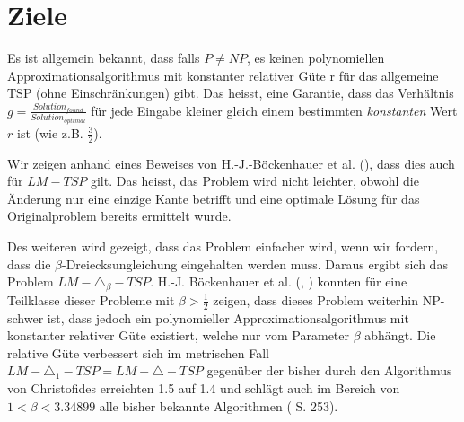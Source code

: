 \documentclass[a4paper,11pt]{scrreprt}
\begin{document}
\begin{description}
%
%
%

\end{description}

\section{Ziele}

Es ist allgemein bekannt, dass falls $P \not= NP$, es keinen polynomiellen Approximationsalgorithmus mit konstanter relativer Güte r für das allgemeine TSP (ohne Einschränkungen) gibt. Das heisst, eine Garantie, dass das Verhältnis $g = \frac{Solution_{found}}{Solution_{optimal}}$ für jede Eingabe kleiner gleich einem bestimmten \emph{konstanten} Wert $r$ ist (wie z.B. $\frac{3}{2}$).

Wir zeigen anhand eines Beweises von H.-J.-Böckenhauer et al. (\cite{bok1}), dass dies auch für $LM-TSP$ gilt. Das heisst, das Problem wird nicht leichter, obwohl die Änderung nur eine einzige Kante betrifft und eine optimale Lösung für das Originalproblem bereits ermittelt wurde.

Des weiteren wird gezeigt, dass das Problem einfacher wird, wenn wir fordern, dass die $\beta$-Dreiecksungleichung eingehalten werden muss. Daraus ergibt sich das Problem $LM-\triangle_\beta-TSP$. H.-J. Böckenhauer et al. (\cite{bok1}, \cite{bok2}) konnten für eine Teilklasse dieser Probleme mit $\beta > \frac{1}{2}$ zeigen, dass dieses Problem weiterhin NP-schwer ist, dass jedoch ein polynomieller Approximationsalgorithmus mit konstanter relativer Güte existiert, welche nur vom Parameter $\beta$ abhängt. Die relative Güte verbessert sich im metrischen Fall $LM-\triangle_1-TSP = LM-\triangle-TSP$ gegenüber der bisher durch den Algorithmus von Christofides erreichten 1.5 auf 1.4 und schlägt auch im Bereich von $1 < \beta < 3.34899$ alle bisher bekannte Algorithmen (\cite{bok1} S. 253).
\end{document}
